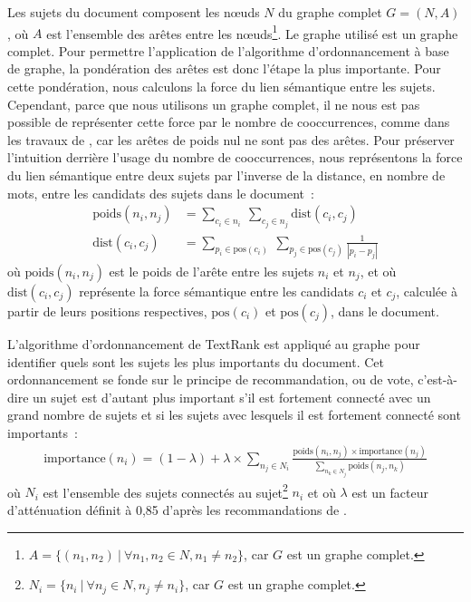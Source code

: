         Les sujets du document composent les n\oe{}uds $N$ du graphe complet $G
        = (N, A)$, où $A$ est l'ensemble des arêtes entre les
        n\oe{}uds\footnote{$A = \{(n_1, n_2)\ |\ \forall{n_1, n_2 \in N}, n_1
        \neq n_2\}$, car $G$ est un graphe complet.}. Le graphe utilisé est un
        graphe complet. Pour permettre l'application de l'algorithme
        d'ordonnancement à base de graphe, la pondération des arêtes est donc
        l'étape la plus importante. Pour cette pondération, nous calculons la
        force du lien sémantique entre les sujets. Cependant, parce que nous
        utilisons un graphe complet, il ne nous est pas possible de représenter
        cette force par le nombre de cooccurrences, comme dans les travaux de
        , car les arêtes de poids nul ne sont pas des
        arêtes. Pour préserver l'intuition derrière l'usage du nombre de
        cooccurrences, nous représentons la force du lien sémantique entre deux
        sujets par l'inverse de la distance, en nombre de mots, entre les
        candidats des sujets dans le document~:
        \begin{align}
          \text{poids}(n_i, n_j) &= \sum_{c_i \in n_i}\ \sum_{c_j \in n_j} \text{dist}(c_i, c_j) \label{math:ponderation}\\
          \text{dist}(c_i, c_j) &= \sum_{p_i \in \text{pos}(c_i)}\ \sum_{p_j \in \text{pos}(c_j)} \frac{1}{|p_i - p_j|} \label{math:distance}
        \end{align}
        où $\text{poids}(n_i, n_j)$ est le poids de l'arête entre les sujets
        $n_i$ et $n_j$, et où $\text{dist}(c_i, c_j)$ représente la force
        sémantique entre les candidats $c_i$ et $c_j$, calculée à partir de
        leurs positions respectives, $\text{pos}(c_i)$ et $\text{pos}(c_j)$,
        dans le document.

        L'algorithme d'ordonnancement de TextRank
        est appliqué au graphe pour identifier quels sont les sujets les plus importants du
        document. Cet ordonnancement se fonde sur le principe de recommandation,
        ou de vote, c'est-à-dire un sujet est d'autant plus important s'il est
        fortement connecté avec un grand nombre de sujets et si les sujets avec
        lesquels il est fortement connecté sont importants~:
        \begin{align}
          \text{importance}(n_i) = (1 - \lambda) + \lambda \times \sum_{n_j \in N_i} \frac{\text{poids}(n_i, n_j) \times \text{importance}(n_j)}{\sum_{n_k \in N_j} \text{poids}(n_j, n_k)} \label{math:textrank}
        \end{align}
        où $N_i$ est l'ensemble des sujets connectés au sujet\footnote{$N_i =
        \{n_i\ |\ \forall{n_j \in N}, n_j \neq n_i\}$, car $G$ est un graphe
        complet.} $n_i$ et où $\lambda$ est un facteur d'atténuation définit à
        0,85 d'après les recommandations de .

